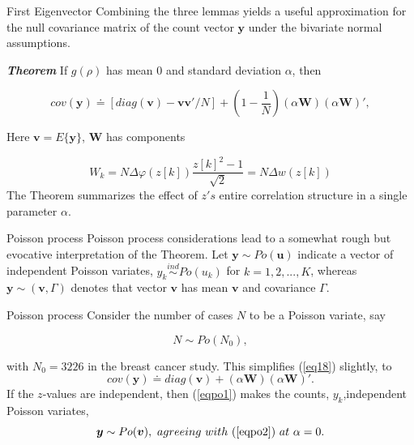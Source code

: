 \documentclass{beamer}
\begin{document}
\begin{frame}[t]{First Eigenvector}\vspace{10pt}
Combining the three lemmas yields a useful approximation for the null covariance matrix of the count vector $\boldsymbol{y}$ under the bivariate normal assumptions.

\textbf{\textit{Theorem}} If $g(\rho)$ has mean 0 and standard deviation $\alpha$, then 

\begin{equation}\label{eq18}
cov(\boldsymbol{y}) \doteq [diag(\boldsymbol{v}) - \boldsymbol{v}\boldsymbol{v'}/N] + \left(1-\frac{1}{N}\right)(\alpha\boldsymbol{W})(\alpha\boldsymbol{W})',
\end{equation}

Here $\boldsymbol{v} = E\{\boldsymbol{y}\}$, $\boldsymbol{W}$ has components

\begin{equation}\label{eq19}
W_k = N\Delta\varphi(z[k])\frac{z[k]^2-1}{\sqrt{2}} =  N\Delta w(z[k])
\end{equation}
The Theorem summarizes the effect of $z's$ entire correlation structure in a single parameter $\alpha$.
\end{frame}

\begin{frame}[t]{Poisson process}\vspace{10pt}
Poisson process considerations lead to a somewhat rough but evocative interpretation of the Theorem. Let $\boldsymbol{y}\sim Po(\boldsymbol{u})$ indicate a vector of independent Poisson variates, $y_k \stackrel{ind}{\sim} Po(u_k)$ for $k=1,2,...,K$, whereas $\boldsymbol{y} \sim (\boldsymbol{v}, \Gamma)$ denotes that vector $\boldsymbol{v}$ has mean $\boldsymbol{v}$ and covariance $\Gamma$.

\end{frame}

\begin{frame}[t]{Poisson process}\vspace{10pt}
Consider the number of cases $N$ to be a Poisson variate, say

\begin{equation}\label{eqpo1}
N \sim Po(N_0),
\end{equation}

with $N_0 = 3226$ in the breast cancer study. This simplifies (\ref{eq18}) slightly, to
\begin{equation}\label{eqpo2}
cov(\boldsymbol{y}) \doteq diag(\boldsymbol{v})  + (\alpha\boldsymbol{W})(\alpha\boldsymbol{W})'.
\end{equation}
If the $z$-values are independent, then (\ref{eqpo1}) makes the counts, $y_k$,independent Poisson variates,
\begin{equation}\label{eqpo3}
\boldsymbol{y} \sim Po(\boldsymbol{v}), \ agreeing \ with \ (\ref{eqpo2})\  at \ \alpha = 0.
\end{equation}
\end{frame}
\end{document}
